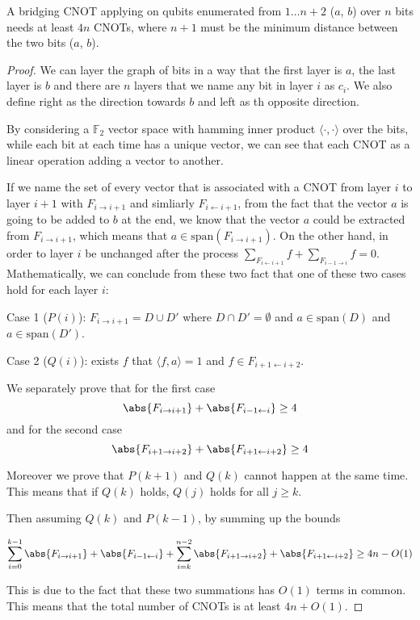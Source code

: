\begin{theorem}
  A bridging CNOT applying on qubits enumerated from $1 \dots n + 2$ ($a$, $b$) over $n$ bits needs at least $4n$ CNOTs, where $n + 1$ must be the minimum distance between the two bits ($a$, $b$).
  \label{thm:bridging-cnot}
\end{theorem}
\begin{proof}
  We can layer the graph of bits in a way that the first layer is $a$, the last layer is $b$ and there are $n$ layers that we name any bit in layer $i$ as $c_i$. We also define right as the direction towards $b$ and left as th opposite direction.

  By considering a $\mathbb{F}_2$ vector space with hamming inner product $\langle \cdot, \cdot \rangle$ over the bits,  while each bit at each time has a unique vector, we can see that each CNOT as a linear operation adding a vector to another.

  If we name the set of every vector that is associated with a CNOT from layer $i$ to layer $i+1$ with $F_{i\rightarrow i+1}$ and simliarly $F_{i\leftarrow i+1}$, from the fact that the vector $a$ is going to be added to $b$ at the end, we know that the vector $a$ could be extracted from $F_{i\rightarrow i+1}$, which means that $a \in \mathrm{span}(F_{i\rightarrow i+1})$. On the other hand, in order to layer $i$ be unchanged after the process $\sum_{F_{i\leftarrow i+1}} f + \sum_{F_{i-1 \rightarrow i}} f = 0$.
  Mathematically, we can conclude from these two fact that one of these two cases hold for each layer $i$:

  Case 1 ($P(i)$): $F_{i\rightarrow i+1} = D \cup D'$ where $D \cap D' = \emptyset$ and $a \in \mathrm{span}(D)$ and $a \in \mathrm{span}(D')$.

  Case 2 ($Q(i)$): exists $f$ that $\langle f, a\rangle = 1$ and $f \in F_{i+1 \leftarrow i+2}$. 

  We separately prove that for the first case 
  \begin{equation}
    \abs{F_{i \rightarrow i+1}} + \abs{F_{i-1 \leftarrow i}} \geq 4
  \end{equation}
  and for the second case
  \begin{equation}
    \abs{F_{i+1 \rightarrow i+2}} + \abs{F_{i+1 \leftarrow i+2}} \geq 4
  \end{equation}

  Moreover we prove that $P(k+1)$ and $Q(k)$ cannot happen at the same time. This means that if $Q(k)$ holds, $Q(j)$ holds for all $j \geq k$.

  Then assuming $Q(k)$ and $P(k-1)$, by summing up the bounds

  \begin{equation}
    \sum_{i=0}^{k-1} \abs{F_{i \rightarrow i+1}} + \abs{F_{i-1 \leftarrow i}} + \sum_{i=k}^{n-2} \abs{F_{i+1 \rightarrow i+2}} + \abs{F_{i+1 \leftarrow i+2}} \geq 4n - O(1)
  \end{equation}

  This is due to the fact that these two summations has $O(1)$ terms in common. This means that the total number of CNOTs is at least $4n + O(1)$.
\end{proof}

